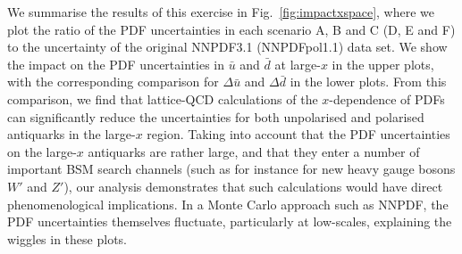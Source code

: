 We summarise the results of this exercise in Fig.~\ref{fig:impactxspace}, 
where we plot the ratio of the PDF uncertainties in each scenario A, B and C 
(D, E and F) to the uncertainty of the original
NNPDF3.1 (NNPDFpol1.1) data set.
%
We show the impact on the PDF uncertainties
in $\bar{u}$ and $\bar{d}$ at large-$x$ in the upper
plots, with the corresponding comparison for $\Delta\bar{u}$
and $\Delta\bar{d}$ in the lower plots.
%
From this comparison, we find that lattice-QCD calculations of the 
$x$-dependence of PDFs can significantly reduce the uncertainties for both 
unpolarised and polarised antiquarks in the large-$x$ region.
%
Taking into account that the PDF uncertainties on the large-$x$
antiquarks are rather large, and that they
enter a number of important BSM search channels
(such as for instance for new heavy gauge bosons $W'$ and $Z'$),
our analysis demonstrates that such calculations would have direct
phenomenological implications.
%
In a Monte Carlo approach such as NNPDF, the
PDF uncertainties themselves fluctuate, particularly at low-scales,
explaining the wiggles in these plots.

